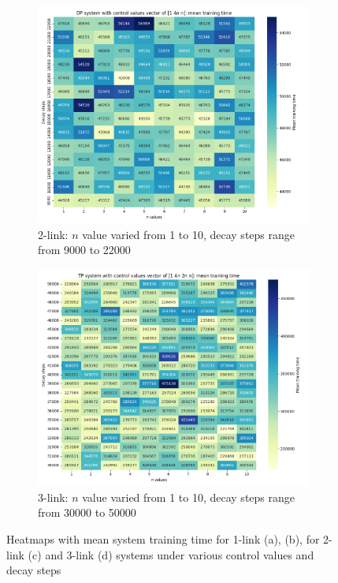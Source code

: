 \begin{figure}[h!]
\begin{subfigure}[t]{0.48\textwidth}
	\end{subfigure}
	\begin{subfigure}[t]{0.48\textwidth}
		\centering
		\includegraphics[width=\textwidth]{Figures/DP_1_4n_n_heatmap_mean.png}
		\caption{2-link: $n$ value varied from 1 to 10, decay steps range from 9000 to 22000}
	\end{subfigure}
	\begin{subfigure}[t]{0.48\textwidth}
		\centering
		\includegraphics[width=\textwidth]{Figures/TP_1_4n_2n_n_heatmap_mean.png}
		\caption{3-link: $n$ value varied from 1 to 10, decay steps range from 30000 to 50000}
	\end{subfigure}
	
	\caption{Heatmaps with mean system training time for 1-link (a), (b), for 2-link (c) and 3-link (d) systems under various control values and decay steps}
	\label{fig: CL heatmaps}
\end{figure}

